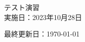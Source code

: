 \documentclass[a4paper,11pt]{jsarticle}
\begin{document}
\begin{titlepage}
  \begin{center}
    {\Huge\gt テスト演習}\\ \vspace{\baselineskip}
    \textup{\large 実施日：2023年10月28日}\\ 
  \end{center}
  \vfill
  \hfill {最終更新日：\today}
\end{titlepage}

\qPart


\qPart

\calcPage

\brankPage

\brankPage

\brankPage
\end{document}

